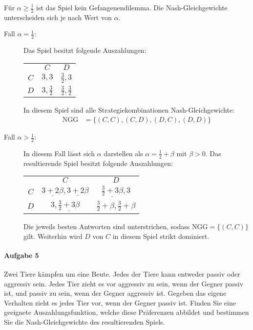 Für $\alpha \geq \frac{1}{2}$ ist das Spiel kein Gefangenendilemma.
Die Nash-Gleichgewichte unterscheiden sich je nach Wert von $\alpha$.
\begin{description}
  \item[Fall $\alpha = \frac{1}{2}$:] Das Spiel besitzt folgende Auszahlungen:
    \begin{center}
      \begin{tabular}{ccc}
        & $C$ & $D$\\
        \cmidrule{2-3}
        $C$ & $3, 3$ & $\frac{3}{2},3$\\
        \cmidrule{2-3}
        $D$ & $3,\frac{3}{2}$ & $\frac{3}{2},\frac{3}{2}$\\
        \cmidrule{2-3}
      \end{tabular}
    \end{center}
    In diesem Spiel sind alle Strategiekombinationen Nash-Gleichgewichte:
    \begin{align*}
      \text{NGG} & = \{(C,C), (C,D), (D,C), (D,D)\}
    \end{align*}

  \item[Fall $\alpha > \frac{1}{2}$:] In diesem Fall lässt sich $\alpha$ darstellen als
    $\alpha = \frac{1}{2} + \beta$ mit $\beta > 0$.
    Das resultierende Spiel besitzt folgende Auszahlungen:
    \begin{center}
      \begin{tabular}{ccc}
        & $C$ & $D$\\
        \cmidrule{2-3}
        $C$ & $\underline{3+2\beta}, \underline{3+2\beta}$
            & $\underline{\frac{3}{2}+3\beta}, 3$\\
        \cmidrule{2-3}
        $D$ & $3, \underline{\frac{3}{2}+3\beta}$
            & $\frac{3}{2}+\beta, \frac{3}{2}+\beta$\\
        \cmidrule{2-3}
      \end{tabular}
    \end{center}
    Die jeweils besten Antworten sind unterstrichen, sodass $\text{NGG} = \{(C,C)\}$ gilt.
    Weiterhin wird $D$ von $C$ in diesem Spiel strikt dominiert.
\end{description}

\paragraph{Aufgabe 5}%
\label{par:serie_2_aufgabe_5}

Zwei Tiere kämpfen um eine Beute.
Jedes der Tiere kann entweder passiv oder aggressiv sein.
Jedes Tier zieht es vor aggressiv zu sein, wenn der Gegner passiv ist, und passiv zu sein,
wenn der Gegner aggressiv ist.
Gegeben das eigene Verhalten zieht es jedes Tier vor, wenn der Gegner passiv ist.
Finden Sie eine geeignete Auszahlungsfunktion, welche diese Präferenzen abbildet und
bestimmen Sie die Nash-Gleichgewichte des resultierenden Spiels.

